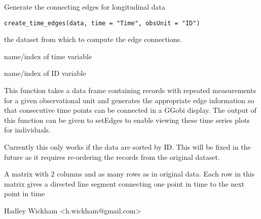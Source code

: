 \begin{Description}\relax
Generate the connecting edges for longitudinal data
\end{Description}
\begin{Usage}
\begin{verbatim}create_time_edges(data, time = "Time", obsUnit = "ID")\end{verbatim}
\end{Usage}
\begin{Arguments}
\begin{ldescription}
\item[\code{data}] the dataset from which to compute the edge connections.
\item[\code{time}] name/index of time variable
\item[\code{obsUnit}] name/index of ID variable
\end{ldescription}
\end{Arguments}
\begin{Details}\relax
This function takes a data frame containing records with repeated
measurements for a given observational unit and generates the
appropriate edge information so that consecutive time
points can be connected in a GGobi display. The output of this
function can be given to setEdges to enable
viewing these time series plots for individuals.

Currently this only works if the data are sorted by ID.
This will be fixed in the future as it requires re-ordering
the records from the original dataset.
\end{Details}
\begin{Value}
A matrix with 2 columns and as many rows as in original data.  Each row in this matrix gives a directed line segment connecting one point in time to the next point in time
\end{Value}
\begin{Author}\relax
Hadley Wickham <h.wickham@gmail.com>
\end{Author}
\begin{Examples}
\begin{ExampleCode}\end{ExampleCode}
\end{Examples}

